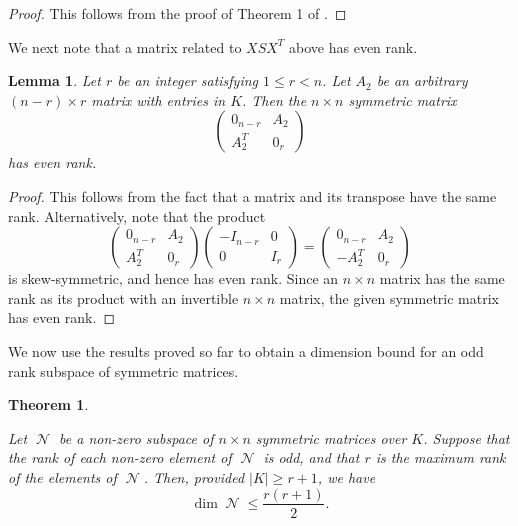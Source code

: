 \documentclass{amsart}
\DeclareMathOperator{\N}{\mathcal{N}}
\theoremstyle{plain}
\newtheorem{theorem}{Theorem}
\newtheorem{lemma}{Lemma}
\theoremstyle{definition}
\begin{document}
\begin{proof}
 
This follows from the proof of Theorem 1 of \cite{Gow2}. 


\end{proof}

We next note that a matrix related to $XSX^T$ above has even rank.

\begin{lemma} \label{even_rank}
 Let $r$ be an integer satisfying $1\leq r<n$. Let $A_2$ be an arbitrary $(n-r)\times r$ matrix with entries in $K$.
 Then the $n\times n$ symmetric matrix 
 \[
 \left(
\begin{array}
{cc}
        0_{n-r}&A_2\\
        A_2^T&0_r  
\end{array}
\right)
\]
 has even rank.
\end{lemma}

\begin{proof}
 This follows from the fact that a matrix and its transpose have the same rank. Alternatively, note that the product
 \[
  \left(
\begin{array}
{cc}
        0_{n-r}&A_2\\
        A_2^T&0_r  
\end{array}
\right)\left(
\begin{array}
{cc}
        -I_{n-r}&0\\
        0&I_r  
\end{array}
\right)=\left(
\begin{array}
{cc}
        0_{n-r}&A_2\\
        -A_2^T&0_r  
\end{array}
\right)
 \]
 is skew-symmetric, and hence has even rank. Since an $n\times n$ matrix has the same rank as its product with an invertible
 $n\times n$ matrix, the given symmetric matrix has even rank. 

 
 
\end{proof}

We now use the results proved so far to obtain a dimension bound for an odd rank subspace of symmetric matrices.

\begin{theorem} \label{odd_dimension_bound}

Let $\N$ be a non-zero subspace of $n\times n$ symmetric matrices over $K$. Suppose that the rank of each non-zero
element of $\N$ is odd, and that $r$ is the maximum rank of the elements of $\N$. Then, provided $|K|\geq r+1$, we have
\[
 \dim \N\leq \frac{r(r+1)}{2}.
\]

 
\end{theorem}
\end{document}
